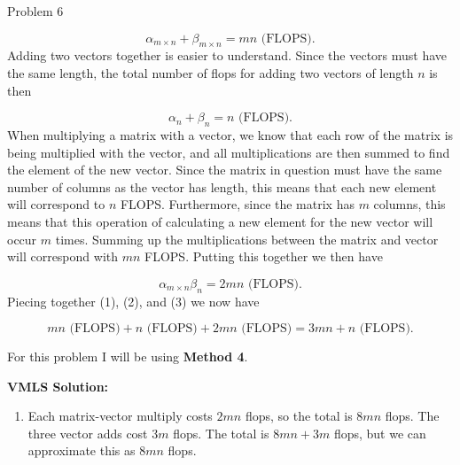 \begin{problem}{Problem 6}
\begin{highlight}
\begin{enumerate}[label = (\alph*)]
            \setcounter{equation}{0}
            \begin{equation}
                \alpha_{m \times n} + \beta_{m \times n} = mn \text{ (FLOPS)}.
            \end{equation}
            Adding two vectors together is easier to understand. Since the vectors must have the same length, the total number of flops for adding two vectors of length $n$ is then
    
            \begin{equation}
                \alpha_{n} + \beta_{n} = n \text{ (FLOPS)}.
            \end{equation}
            When multiplying a matrix with a vector, we know that each row of the matrix is being multiplied with the vector, and all multiplications are then summed to find the element of the new vector.
            Since the matrix in question must have the same number of columns as the vector has length, this means that each new element will correspond to $n$ FLOPS. Furthermore, since the matrix has 
            $m$ columns, this means that this operation of calculating a new element for the new vector will occur $m$ times. Summing up the multiplications between the matrix and vector will correspond
            with $mn$ FLOPS. Putting this together we then have
    
            \begin{equation}
                \alpha_{m \times n}\beta_{n} = 2mn \text{ (FLOPS)}.
            \end{equation}
            Piecing together (1), (2), and (3) we now have
    
            \begin{equation}
                mn \text{ (FLOPS)} + n \text{ (FLOPS)} + 2mn \text{ (FLOPS)} = 3mn + n \text{ (FLOPS)}.
            \end{equation}
        \end{enumerate}
    \end{highlight}

    \begin{highlight}
        For this problem I will be using \textbf{Method 4}. \vspace*{1em}

        \noindent \textbf{VMLS Solution:}

        \begin{enumerate}[label = (\alph*), start = 2]
            \item Each matrix-vector multiply costs $2mn$ flops, so the total is $8mn$ flops. The three vector adds cost $3m$ flops. The total is $8mn + 3m$ flops, but we can approximate this as $8mn$ flops.
        \end{enumerate}


\end{highlight}
\end{problem}

